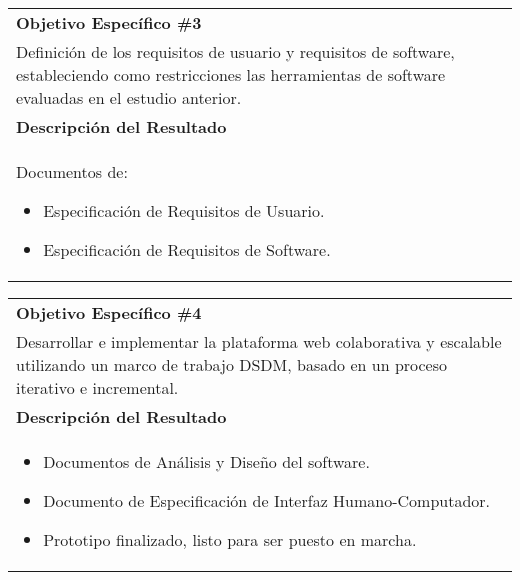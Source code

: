 \newpage

\begin{table}[H]
	\centering
	\begin{tabular}{|p{\textwidth}|}
        \hline
        \textbf{Objetivo Específico \#3}
        \\
        \vspace{0.5mm}
        Definición de los requisitos de usuario y requisitos de
        software, estableciendo como restricciones las herramientas de
        software evaluadas en el estudio anterior.
        \\ \hline
        \textbf{Descripción del Resultado}
        \\
        \vspace{0.5mm}
        Documentos de:
        \begin{itemize}
            \item Especificación de Requisitos de Usuario.
            \item Especificación de Requisitos de Software.
        \end{itemize}
        \\
        \hline
	\end{tabular}
\end{table}

\begin{table}[H]
	\centering
	\begin{tabular}{|p{\textwidth}|}
        \hline
        \textbf{Objetivo Específico \#4}
        \\
        \vspace{0.5mm}
        Desarrollar e implementar la plataforma web colaborativa y
        escalable utilizando un marco de trabajo DSDM, basado en un
        proceso iterativo e incremental.
        \\ \hline
        \textbf{Descripción del Resultado}
        \\
        \vspace{0.5mm}
        \begin{itemize}
            \item Documentos de Análisis y Diseño del software.
            \item Documento de Especificación de Interfaz
                Humano-Computador.
            \item Prototipo finalizado, listo para ser puesto en marcha.
        \end{itemize}
        \\
        \hline
	\end{tabular}
\end{table}

